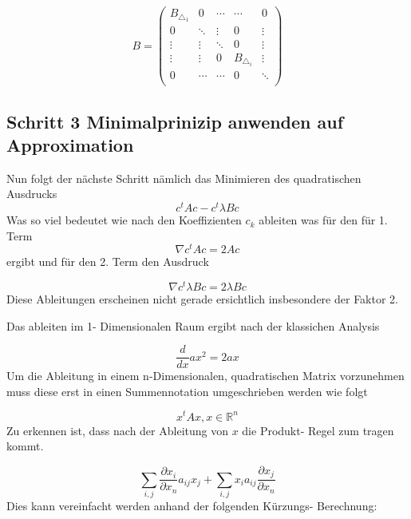 \begin{equation}
B =	\begin{pmatrix}
	B_{\triangle_1} & 0 & \cdots & \cdots & 0 \\
	0 & \ddots & \vdots & 0 & \vdots \\
	\vdots & \vdots & \ddots & 0 & \vdots \\
	\vdots & \vdots & 0 & B_{\triangle_i} & \vdots \\
	0 & \cdots & \cdots & 0 &  \ddots \\
	\end{pmatrix}
\end{equation}


\subsection{Schritt 3 Minimalprinizip anwenden auf Approximation}

Nun folgt der nächste Schritt nämlich das Minimieren des quadratischen Ausdrucks
\begin{equation}
	c^t Ac - c^t \lambda Bc
\end{equation}
Was so viel bedeutet wie nach den Koeffizienten $c_k$ ableiten was für den  für 1. Term
\begin{equation}
	\nabla c^t Ac = 2Ac
\end{equation}
ergibt und für den 2. Term den Ausdruck

\begin{equation}
	\nabla c^t \lambda Bc = 2\lambda Bc
\end{equation}
Diese Ableitungen erscheinen nicht gerade ersichtlich insbesondere der Faktor 2. 

Das ableiten im 1- Dimensionalen Raum ergibt nach der klassichen Analysis

\begin{equation}
	\frac{d}{dx} ax^2 = 2ax
\end{equation}
Um die Ableitung in einem n-Dimensionalen, quadratischen Matrix vorzunehmen muss diese erst in einen Summennotation umgeschrieben werden wie folgt

\begin{equation}
			x^tAx, x \in \mathbb{R}^n
\end{equation}
Zu erkennen ist, dass nach der Ableitung von $x$ die Produkt- Regel zum tragen kommt. 

\begin{equation}
	\sum_{i,j} \frac{\partial x_i}{\partial x_n} a_{ij} x_j + \sum_{i,j} x_i a_{ij} \frac{\partial x_j}{\partial x_n}
\end{equation}
Dies kann vereinfacht werden anhand der folgenden Kürzungs- Berechnung:

